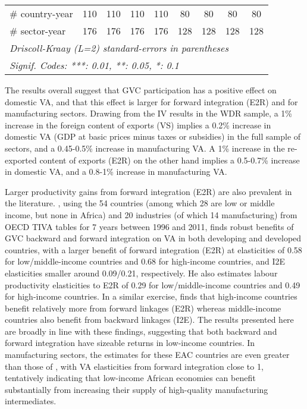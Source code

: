\documentclass[a4paper]{article}
\begin{document}
\begin{table}[h!]
{\begin{tabular}{lcccccccc}
      \# country-year         & 110                & 110                   & 110                    & 110                   & 80                 & 80                    & 80                     & 80\\  
      \# sector-year          & 176                & 176                   & 176                    & 176                   & 128                & 128                   & 128                    & 128\\ 
      \midrule \midrule
      \multicolumn{9}{l}{\emph{Driscoll-Kraay (L=2) standard-errors in parentheses}}\\
      \multicolumn{9}{l}{\emph{Signif. Codes: ***: 0.01, **: 0.05, *: 0.1}}\\
   \end{tabular}
   }
\end{table}
\FloatBarrier

\newpage

The results overall suggest that GVC participation has a positive effect on domestic VA, and that this effect is larger for forward integration (E2R) and for manufacturing sectors. Drawing from the IV results in the WDR sample, a 1\% increase in the foreign content of exports (VS) implies a 0.2\% increase in domestic VA (GDP at basic prices minus taxes or subsidies) in the full sample of sectors, and a 0.45-0.5\% increase in manufacturing VA. A 1\% increase in the re-exported content of exports (E2R) on the other hand implies a 0.5-0.7\% increase in domestic VA, and a 0.8-1\% increase in manufacturing VA. \newline

Larger productivity gains from forward integration (E2R) are also prevalent in the literature. \citet{Kummritz20161}, using the 54 countries (among which 28 are low or middle income, but none in Africa) and 20 industries (of which 14 manufacturing) from OECD TIVA tables for 7 years between 1996 and 2011, finds robust benefits of GVC backward and forward integration on VA in both developing and developed countries, with a larger benefit of forward integration (E2R) at elasticities of 0.58 for low/middle-income countries and 0.68 for high-income countries, and I2E elasticities smaller around 0.09/0.21, respectively. He also estimates labour productivity elasticities to E2R of 0.29 for low/middle-income countries and 0.49 for high-income countries. In a similar exercise, \citet{kummritz2015global} finds that high-income countries benefit relatively more from forward linkages (E2R) whereas middle-income countries also benefit from backward linkages (I2E). The results presented here are broadly in line with these findings, suggesting that both backward and forward integration have sizeable returns in low-income countries. In manufacturing sectors, the estimates for these EAC countries are even greater than those of \citet{Kummritz20161}, with VA elasticities from forward integration close to 1, tentatively indicating that low-income African economies can benefit substantially from increasing their supply of high-quality manufacturing intermediates. \newline
 
\end{document}
